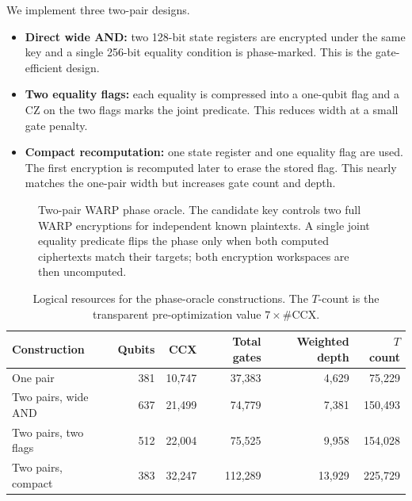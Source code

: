 \documentclass[pdflatex,sn-nature]{sn-jnl}
\providecommand{\ket}[1]{\lvert #1\rangle}
\theoremstyle{thmstyleone}
\theoremstyle{thmstyletwo}
\begin{document}
We implement three two-pair designs.
\begin{itemize}
    \item \textbf{Direct wide AND:} two 128-bit state registers are encrypted under the same key and a single 256-bit equality condition is phase-marked. This is the gate-efficient design.
    \item \textbf{Two equality flags:} each equality is compressed into a one-qubit flag and a CZ on the two flags marks the joint predicate. This reduces width at a small gate penalty.
    \item \textbf{Compact recomputation:} one state register and one equality flag are used. The first encryption is recomputed later to erase the stored flag. This nearly matches the one-pair width but increases gate count and depth.
\end{itemize}

\begin{figure}[tbp]
\centering
{}
\caption{Two-pair WARP phase oracle. The candidate key controls two full WARP encryptions for independent known plaintexts. A single joint equality predicate flips the phase only when both computed ciphertexts match their targets; both encryption workspaces are then uncomputed.}
\label{fig:two_pair_oracle}
\end{figure}

\begin{table}[t]
\centering
\caption{Logical resources for the phase-oracle constructions. The $T$-count is the transparent pre-optimization value $7\times\#\mathrm{CCX}$.}
\label{tab:oracle_resources}
\small
\begin{tabular}{lrrrrr}
\toprule
Construction & Qubits & CCX & Total gates & Weighted depth & $T$ count\\
\midrule
One pair & 381 & 10,747 & 37,383 & 4,629 & 75,229\\
Two pairs, wide AND & 637 & 21,499 & 74,779 & 7,381 & 150,493\\
Two pairs, two flags & 512 & 22,004 & 75,525 & 9,958 & 154,028\\
Two pairs, compact & 383 & 32,247 & 112,289 & 13,929 & 225,729\\
\bottomrule
\end{tabular}
\end{table}
\end{document}
